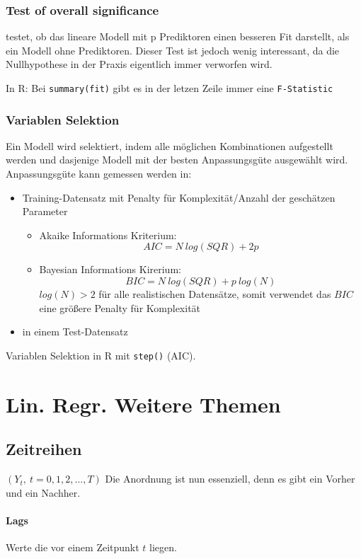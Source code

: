 \documentclass[a3paper, 8pt]{extarticle}
\begin{document}
\begin{multicols*}{5}
\begin{enumerate}
\subsubsection{Test of overall significance} testet, ob das lineare Modell mit p Prediktoren einen besseren Fit darstellt, als ein Modell ohne Prediktoren. Dieser Test ist jedoch wenig interessant, da die Nullhypothese in der Praxis eigentlich immer verworfen wird.

In R: Bei \texttt{summary(fit)} gibt es in der letzen Zeile immer eine \texttt{F-Statistic}

\subsubsection{Variablen Selektion} Ein Modell wird selektiert, indem alle möglichen Kombinationen aufgestellt werden und dasjenige Modell mit der besten Anpassungsgüte ausgewählt wird. Anpassungsgüte kann gemessen werden in: \begin{itemize}
    \item Training-Datensatz mit Penalty für Komplexität/Anzahl der geschätzen Parameter \begin{itemize}
        \item Akaike Informations Kriterium: $$AIC=N \ log(SQR)+2p$$
        \item Bayesian Informations Kirerium: $$BIC= N \ log(SQR)+ p \ log(N)$$
        $log(N) > 2$ für alle realistischen Datensätze, somit verwendet das $BIC$ eine größere Penalty für Komplexität
    \end{itemize}
    \item in einem Test-Datensatz
\end{itemize}

Variablen Selektion in R mit \texttt{step()} (AIC). 

\section{Lin. Regr. Weitere Themen} 

\subsection{Zeitreihen} $(Y_t, \ t=0,1,2,\dots,T)$ Die Anordnung ist nun essenziell, denn es gibt ein Vorher und ein Nachher. 

\paragraph{Lags} Werte die vor einem Zeitpunkt $t$ liegen.


\end{enumerate}
\end{multicols*}
\end{document}
